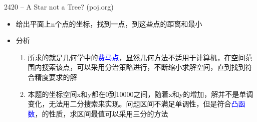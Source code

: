 \begin{frame}{2420 -- A Star not a Tree? (poj.org)}
    \begin{itemize}
        \item 给出平面上n个点的坐标，找到一点，到这些点的距离和最小
    \end{itemize}
    \vfill
    \begin{itemize}
        \item 分析
        \begin{enumerate}
            \item 所求的就是几何学中的\textcolor{blue}{费马点}，显然几何方法不适用于计算机，在空间范围内搜索该点，可以采用分治策略进行，不断缩小求解空间，直到找到符合精度要求的解
            \item 本题的坐标空间x和y都在0到10000之间，随着x和y的增加，解并不是单调变化，无法用二分搜索来实现。问题区间不满足单调性，但是符合\textcolor{blue}{凸函数}，的性质，求区间最值可以采用三分的方法
        \end{enumerate}
    \end{itemize}
\end{frame}

